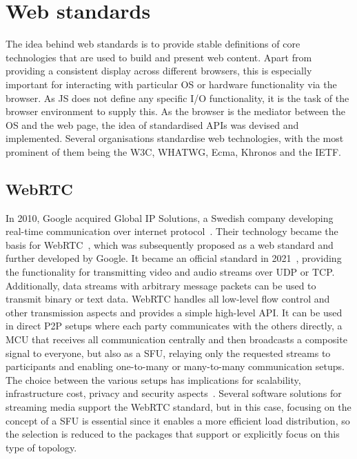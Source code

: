 \section{Web standards}
\label{sec:webstandards}

The idea behind web standards is to provide stable definitions of core technologies that are used to build and present web content.
Apart from providing a consistent display across different browsers, this is especially important for interacting with particular \ac{OS} or hardware functionality via the browser.
As \ac{JS} does not define any specific \ac{I/O} functionality, it is the task of the browser environment to supply this.
As the browser is the mediator between the \ac{OS} and the web page, the idea of standardised \ac{API}s was devised and implemented.
Several organisations standardise web technologies, with the most prominent of them being the \ac{W3C}, \ac{WHATWG}, Ecma, Khronos and the \ac{IETF}.

\subsection{WebRTC}

In 2010, Google acquired Global IP Solutions, a Swedish company developing real-time communication over internet protocol~\parencite{googleGlobalIpAcquisition}.
Their technology became the basis for \ac{WebRTC}~\parencite{webRtcGlobalIPSolutions}, which was subsequently proposed as a web standard and further developed by Google.
It became an official standard in 2021~\parencite{webRtcOfficialWebStandard}, providing the functionality for transmitting video and audio streams over \ac{UDP} or \ac{TCP}.
Additionally, data streams with arbitrary message packets can be used to transmit binary or text data.
WebRTC handles all low-level flow control and other transmission aspects and provides a simple high-level \ac{API}.
It can be used in direct \ac{P2P} setups where each party communicates with the others directly, a \ac{MCU} that receives all communication centrally and then broadcasts a composite signal to everyone, but also as a \ac{SFU}, relaying only the requested streams to participants and enabling one-to-many or many-to-many communication setups.
The choice between the various setups has implications for scalability, infrastructure cost, privacy and security aspects~\parencite{webRtcArchitectures}.
Several software solutions for streaming media support the \ac{WebRTC} standard, but in this case, focusing on the concept of a \ac{SFU} is essential since it enables a more efficient load distribution, so the selection is reduced to the packages that support or explicitly focus on this type of topology.

